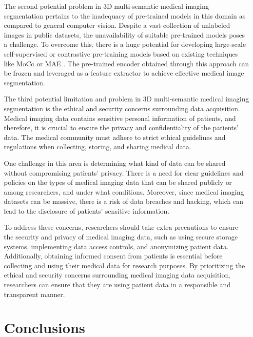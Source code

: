 \documentclass{article}
\begin{document}
The second potential problem in 3D multi-semantic medical imaging segmentation pertains to the inadequacy of pre-trained models in this domain as compared to general computer vision. Despite a vast collection of unlabeled images in public datasets, the unavailability of suitable pre-trained models poses a challenge. To overcome this, there is a huge potential for developing large-scale self-supervised or contrastive pre-training models based on existing techniques like MoCo \cite{42} or MAE \cite{43}. The pre-trained encoder obtained through this approach can be frozen and leveraged as a feature extractor to achieve effective medical image segmentation.

The third potential limitation and problem in 3D multi-semantic medical imaging segmentation is the ethical and security concerns surrounding data acquisition. Medical imaging data contains sensitive personal information of patients, and therefore, it is crucial to ensure the privacy and confidentiality of the patients' data. The medical community must adhere to strict ethical guidelines and regulations when collecting, storing, and sharing medical data.

One challenge in this area is determining what kind of data can be shared without compromising patients' privacy. There is a need for clear guidelines and policies on the types of medical imaging data that can be shared publicly or among researchers, and under what conditions. Moreover, since medical imaging datasets can be massive, there is a risk of data breaches and hacking, which can lead to the disclosure of patients' sensitive information.

To address these concerns, researchers should take extra precautions to ensure the security and privacy of medical imaging data, such as using secure storage systems, implementing data access controls, and anonymizing patient data. Additionally, obtaining informed consent from patients is essential before collecting and using their medical data for research purposes. By prioritizing the ethical and security concerns surrounding medical imaging data acquisition, researchers can ensure that they are using patient data in a responsible and transparent manner.

\section{Conclusions}
\end{document}
